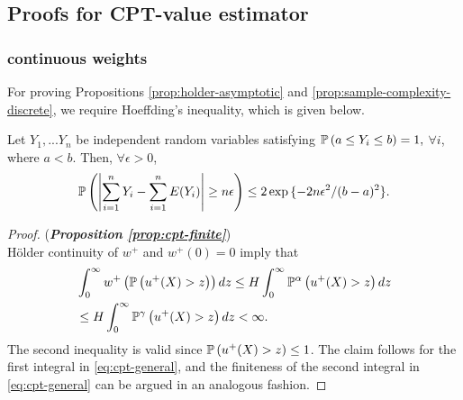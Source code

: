 \subsection{Proofs for CPT-value estimator}
\label{appendix:cpt-est}

\subsubsection{\holder continuous weights}
\label{sec:holder-proofs}
For proving Propositions \ref{prop:holder-asymptotic} and \ref{prop:sample-complexity-discrete}, we require Hoeffding's inequality, which is given below.
\begin{lemma}
Let $Y_1,...Y_n$ be independent random variables satisfying $\mathbb{P}\left( a\leq Y_i \leq b \right)= 1,$ $\forall i$, where $a<b.
$ Then, $\forall \epsilon>0$,
$$\mathbb{P}\left( \left|\sum_{i=1}^n Y_i -\sum_{i=1}^n E(Y_i)\right| \geq n\epsilon  \right) \leq 2\exp{\{-2n\epsilon^2 /(b-a)^2\}}. $$
\end{lemma}

\begin{proof}(\textbf{\textit{Proposition \ref{prop:cpt-finite}}})\ \\
H\"{o}lder continuity of $w^+$ and $w^+(0)=0$ imply that 
\begin{align*}
&\int_0^{\infty} w^+\left(\mathbb{P}\left( u^{+}(X)>z \right)\right) dz 
\le H \int_0^{\infty} \mathbb{P}^{\alpha} \left(u^+(X)>z\right) dz\\
&\le H \int_0^{\infty} \mathbb{P}^{\gamma} \left(u^+(X)>z\right) dz 
<\infty.
\end{align*}
The second inequality is valid since $\mathbb{P}\left( u^+(X)>z \right) \leq 1$. The claim follows for the first integral in \eqref{eq:cpt-general}, and the finiteness of the second integral in \eqref{eq:cpt-general} can be argued in an analogous fashion.
\end{proof}

